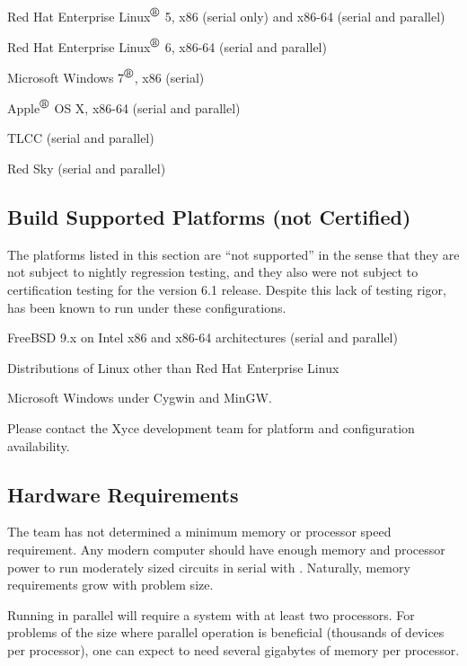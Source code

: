 \documentclass[11pt,report,strict]{SANDreport}
\begin{document}
\begin{XyceItemize}
\item Red Hat Enterprise Linux${}^{\mbox{\textregistered}}$ 5, x86 (serial only) and x86-64 (serial and parallel)
\item Red Hat Enterprise Linux${}^{\mbox{\textregistered}}$ 6, x86-64 (serial and parallel)
\item Microsoft Windows 7${}^{\mbox{\textregistered}}$, x86 (serial)
\item Apple${}^{\mbox{\textregistered}}$ OS X, x86-64 (serial and parallel)
\item TLCC (serial and parallel)
\item Red Sky (serial and parallel)
\end{XyceItemize}

\subsection{Build Supported Platforms (not Certified)}
The platforms listed in this section are ``not supported'' in the
sense that they are not subject to nightly regression testing, and
they also were not subject to certification testing for the \Xyce{}
version 6.1 release.  Despite this lack of testing rigor, \Xyce{} has
been known to run under these configurations.

\begin{XyceItemize}
\item FreeBSD 9.x on Intel x86 and x86-64 architectures (serial and parallel)
\item Distributions of Linux other than Red Hat Enterprise Linux
\item Microsoft Windows under Cygwin and MinGW.
\end{XyceItemize}

Please contact the Xyce development team for platform and configuration availability.

\subsection{Hardware Requirements}

The \Xyce{} team has not determined a minimum memory or processor
speed requirement.  Any modern computer should have enough memory and
processor power to run moderately sized circuits in serial with
\Xyce{}.  Naturally, memory requirements grow with problem size.  

Running \Xyce{} in parallel will require a system with at least two
processors. For problems of the size where parallel operation is
beneficial (thousands of devices per processor), one can expect to
need several gigabytes of memory per processor. 
\end{document}
